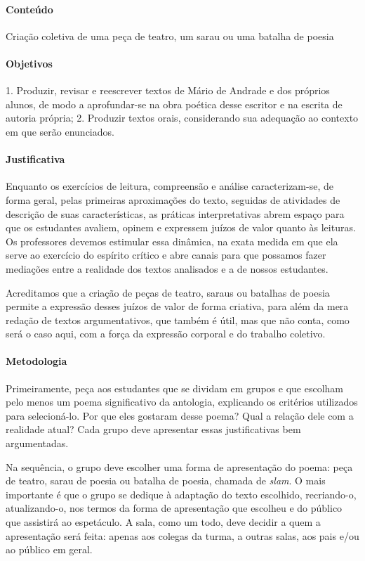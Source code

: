 \documentclass[11pt]{extarticle}
\begin{document}
\paragraph{Conteúdo} Criação coletiva de uma peça de teatro, um sarau ou
uma batalha de poesia

\paragraph{Objetivos} 1. Produzir, revisar e reescrever textos de Mário de
Andrade e dos próprios alunos, de modo a aprofundar-se na obra poética
desse escritor e na escrita de autoria própria; 2. Produzir textos
orais, considerando sua adequação ao contexto em que serão enunciados.

\paragraph{Justificativa} Enquanto os exercícios de leitura, compreensão e
análise caracterizam-se, de forma geral, pelas primeiras aproximações do
texto, seguidas de atividades de descrição de suas características, as
práticas interpretativas abrem espaço para que os estudantes avaliem,
opinem e expressem juízos de valor quanto às leituras. Os professores
devemos estimular essa dinâmica, na exata medida em que ela serve ao
exercício do espírito crítico e abre canais para que possamos fazer
mediações entre a realidade dos textos analisados e a de nossos
estudantes.


Acreditamos que a criação de peças de teatro, saraus ou batalhas de
poesia permite a expressão desses juízos de valor de forma criativa,
para além da mera redação de textos argumentativos, que também é útil,
mas que não conta, como será o caso aqui, com a força da expressão
corporal e do trabalho coletivo.

\paragraph{Metodologia}

Primeiramente, peça aos estudantes que se dividam em grupos e que
escolham pelo menos um poema significativo da antologia, explicando os
critérios utilizados para selecioná-lo. Por que eles gostaram desse
poema? Qual a relação dele com a realidade atual? Cada grupo deve
apresentar essas justificativas bem argumentadas.

Na sequência, o grupo deve escolher uma forma de apresentação do poema:
peça de teatro, sarau de poesia ou batalha de poesia, chamada de
\emph{slam}. O mais importante é que o grupo se dedique à adaptação do
texto escolhido, recriando-o, atualizando-o, nos termos da forma de
apresentação que escolheu e do público que assistirá ao espetáculo. A
sala, como um todo, deve decidir a quem a apresentação será feita:
apenas aos colegas da turma, a outras salas, aos pais e/ou ao público em
geral.
\end{document}
